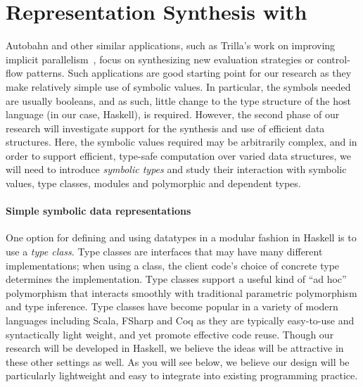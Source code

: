 \section{Representation Synthesis with \rasps}
\label{sec:eval}

Autobahn and other similar applications, such as Trilla's work on
improving implicit parallelism~\cite{implicit-parallelism}, focus on synthesizing new evaluation
strategies or control-flow patterns.  Such applications are good starting point for our research as
they make relatively simple use of symbolic values.  In particular, the symbols needed are usually
booleans, and as such, little change to the type structure of the host language (in our case, Haskell),
is required.  However, the second phase of our research will investigate \rasp support for the synthesis
and use of efficient data structures.  Here, the symbolic values required may be arbitrarily complex,
and in order to support efficient, type-safe computation over varied data structures, we will need to
introduce \emph{symbolic types} and study their interaction with symbolic values, type classes, modules
and polymorphic and dependent types. 

\paragraph*{Simple symbolic data representations}
One option for defining and using datatypes in a modular fashion in Haskell is to use a \emph{type class}.  
Type classes are interfaces that may have many different implementations; when using a class, the client 
code's choice of concrete type determines the implementation.  Type classes support a useful kind of ``ad hoc'' 
polymorphism that interacts smoothly with traditional parametric polymorphism and type inference.  Type
classes have become popular in a variety of modern languages including Scala, FSharp and Coq as they
are typically easy-to-use and syntactically light weight, and yet promote effective code reuse.  
Though our research 
will be developed in Haskell, we believe the ideas will be attractive in these other settings as well.
As you will see below, we believe our design will be particularly lightweight and easy to integrate into
existing programming practice.

